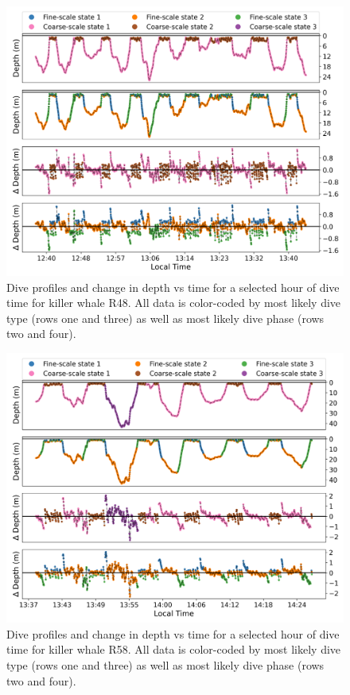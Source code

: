 \documentclass[12pt]{article}
\begin{document}
\begin{figure}[H]
    \centering
    \includegraphics[width=6.5in]{../plt/decoded_dives_kw_R48_K_3_3_nWhales_8.png}
    \caption{Dive profiles and change in depth vs time for a selected hour of dive time for killer whale R48. All data is color-coded by most likely dive type (rows one and three) as well as most likely dive phase (rows two and four).}
    \label{fig:R48}
\end{figure}

\begin{figure}[H]
    \centering
    \includegraphics[width=6.5in]{../plt/decoded_dives_kw_R58_K_3_3_nWhales_8.png}
    \caption{Dive profiles and change in depth vs time for a selected hour of dive time for killer whale R58. All data is color-coded by most likely dive type (rows one and three) as well as most likely dive phase (rows two and four).}
    \label{fig:R58}
\end{figure}
\end{document}
